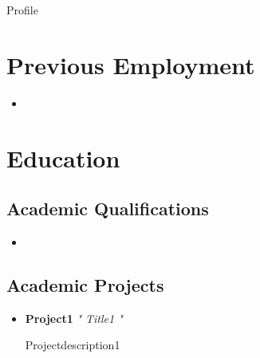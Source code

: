 \documentclass[11pt,a4paper,sans]{moderncv}
\begin{document}
\makecvtitle

\small{ {{Profile}} }

\section{Previous Employment}

\vspace{6pt}

\begin{itemize}

\item{}

\end{itemize}

\section{Education}

\vspace{5pt}

\subsection{Academic Qualifications}

\vspace{5pt}

\begin{itemize}

\item{ }

\end{itemize}

\vspace{2pt}

\subsection{Academic Projects}

\vspace{12pt}

\begin{itemize}

\item{\textbf{ {{Project1}} } \textit{" {{Title1}} "}

\vspace{3pt}

\small{ {{Projectdescription1}} }}

\vspace{8pt}

\end{itemize}
\end{document}
